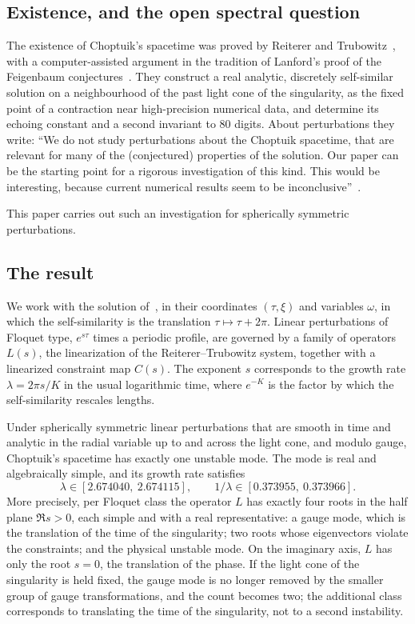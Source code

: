 \subsection{Existence, and the open spectral question}

The existence of Choptuik's spacetime was proved by Reiterer and Trubowitz~\cite{RT2019}, with a computer-assisted
argument in the tradition of Lanford's proof of the Feigenbaum conjectures~\cite{Lanford1982}. They construct a
real analytic, discretely self-similar solution on a neighbourhood of the past light cone of the singularity, as
the fixed point of a contraction near high-precision numerical data, and determine its echoing constant and a
second invariant to $80$ digits. About perturbations they write: ``We do not study perturbations about the
Choptuik spacetime, that are relevant for many of the (conjectured) properties of the solution. Our paper can be
the starting point for a rigorous investigation of this kind. This would be interesting, because current
numerical results seem to be inconclusive''~\cite[\S1]{RT2019}.

This paper carries out such an investigation for spherically symmetric perturbations.

\subsection{The result}

We work with the solution of~\cite{RT2019}, in their coordinates $(\tau,\xi)$ and variables $\omega$, in which the
self-similarity is the translation $\tau\mapsto\tau+2\pi$. Linear perturbations of Floquet type,
$e^{s\tau}$ times a periodic profile, are governed by a family of operators $L(s)$, the linearization of the
Reiterer--Trubowitz system, together with a linearized constraint map $C(s)$. The exponent $s$ corresponds to the
growth rate $\lambda=2\pi s/K$ in the usual logarithmic time, where $e^{-K}$ is the factor by which the
self-similarity rescales lengths.

\begin{introthm}
Under spherically symmetric linear perturbations that are smooth in time and analytic in the radial variable up to
and across the light cone, and modulo gauge, Choptuik's spacetime has exactly one unstable mode. The mode is real and algebraically simple, and its growth rate satisfies
\[
  \lambda\in[2.674040,\ 2.674115],\qquad 1/\lambda\in[0.373955,\ 0.373966].
\]
More precisely, per Floquet class the operator $L$ has exactly four roots in the half plane $\Re s>0$, each simple
and with a real representative: a gauge mode, which is the translation of the time of the singularity; two roots whose eigenvectors
violate the constraints; and the physical unstable mode. On the imaginary axis, $L$ has only the root $s=0$, the
translation of the phase. If the light cone of the singularity is held fixed, the gauge mode is no longer removed by the
smaller group of gauge transformations, and the count becomes two; the additional class corresponds to translating
the time of the singularity, not to a second instability.
\end{introthm}


